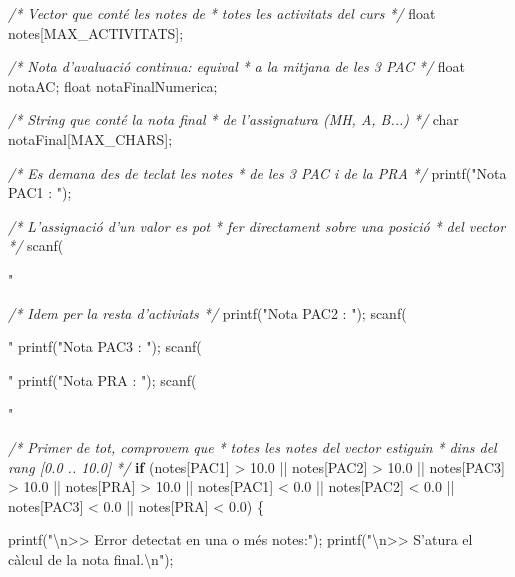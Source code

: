 \documentclass[]{book}
\newenvironment{Shaded}{\begin{snugshade}}{\end{snugshade}}
\newcommand{\DataTypeTok}[1]{\textcolor[rgb]{0.13,0.29,0.53}{#1}}
\newcommand{\FloatTok}[1]{\textcolor[rgb]{0.00,0.00,0.81}{#1}}
\newcommand{\SpecialCharTok}[1]{\textcolor[rgb]{0.00,0.00,0.00}{#1}}
\newcommand{\StringTok}[1]{\textcolor[rgb]{0.31,0.60,0.02}{#1}}
\newcommand{\CommentTok}[1]{\textcolor[rgb]{0.56,0.35,0.01}{\textit{#1}}}
\newcommand{\ControlFlowTok}[1]{\textcolor[rgb]{0.13,0.29,0.53}{\textbf{#1}}}
\newcommand{\NormalTok}[1]{#1}
\begin{document}
\begin{Shaded}
\begin{Highlighting}[]
{{{    \CommentTok{/* Vector que conté les notes de }
\CommentTok{     * totes les activitats del curs }
\CommentTok{     */}
    \DataTypeTok{float}\NormalTok{ notes[MAX_ACTIVITATS]; }

    \CommentTok{/* Nota d'avaluació continua: equival}
\CommentTok{     * a la mitjana de les 3 PAC }
\CommentTok{     */}
    \DataTypeTok{float}\NormalTok{ notaAC;}
    \DataTypeTok{float}\NormalTok{ notaFinalNumerica;}

    \CommentTok{/* String que conté la nota final }
\CommentTok{     * de l'assignatura (MH, A, B...) }
\CommentTok{     */}
    \DataTypeTok{char}\NormalTok{ notaFinal[MAX_CHARS];}

    \CommentTok{/* Es demana des de teclat les notes}
\CommentTok{     * de les 3 PAC i de la PRA }
\CommentTok{     */}
\NormalTok{    printf(}\StringTok{"Nota PAC1 : "}\NormalTok{);}

    \CommentTok{/* L'assignació d'un valor es pot}
\CommentTok{     * fer directament sobre una posició}
\CommentTok{     * del vector}
\CommentTok{     */}
\NormalTok{    scanf(}\StringTok{"%

    \CommentTok{/* Idem per la resta d'activiats */}
\NormalTok{    printf(}\StringTok{"Nota PAC2 : "}\NormalTok{);}
\NormalTok{    scanf(}\StringTok{"%
\NormalTok{    printf(}\StringTok{"Nota PAC3 : "}\NormalTok{);}
\NormalTok{    scanf(}\StringTok{"%
\NormalTok{    printf(}\StringTok{"Nota PRA : "}\NormalTok{);}
\NormalTok{    scanf(}\StringTok{"%

    \CommentTok{/* Primer de tot, comprovem que}
\CommentTok{     * totes les notes del vector estiguin}
\CommentTok{     * dins del rang [0.0 .. 10.0]}
\CommentTok{     */}
    \ControlFlowTok{if}\NormalTok{ (notes[PAC1] > }\FloatTok{10.0}\NormalTok{ || notes[PAC2] > }\FloatTok{10.0}\NormalTok{ ||}
\NormalTok{        notes[PAC3] > }\FloatTok{10.0}\NormalTok{ || notes[PRA] > }\FloatTok{10.0}\NormalTok{ ||}
\NormalTok{        notes[PAC1] < }\FloatTok{0.0}\NormalTok{ || notes[PAC2] < }\FloatTok{0.0}\NormalTok{ ||}
\NormalTok{        notes[PAC3] < }\FloatTok{0.0}\NormalTok{ || notes[PRA] < }\FloatTok{0.0}\NormalTok{) \{}

\NormalTok{        printf(}\StringTok{"}\SpecialCharTok{\textbackslash{}n}\StringTok{>> Error detectat en una o més notes:"}\NormalTok{);}
\NormalTok{        printf(}\StringTok{"}\SpecialCharTok{\textbackslash{}n}\StringTok{>> S'atura el càlcul de la nota final.}\SpecialCharTok{\textbackslash{}n}\StringTok{"}\NormalTok{);}

}}}}}}}
\end{Highlighting}
\end{Shaded}
\end{document}
